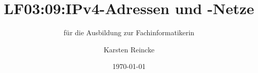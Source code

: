 \documentclass[]{beamer}
\title{LF03:09:IPv4-Adressen und -Netze}
\subtitle{für die Ausbildung zur Fachinformatikerin}
\institute[GS-LDK]{Gewerbliche Schulen Dillenburg}
\author{Karsten Reincke}
\date{\today}
\def\cfgGl{../../../cfg.gl/}
\begin{document}

\begin{frame}
  \titlepage

  
\end{frame}






\logo{}
\newpage



%
\end{document}
